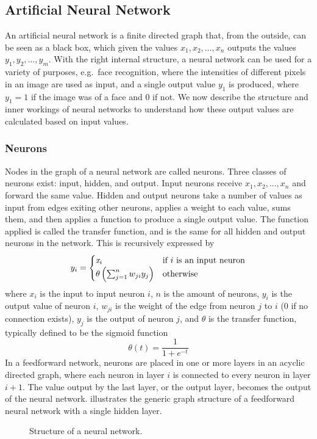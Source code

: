\subsection{Artificial Neural Network}
An artificial neural network is a finite directed graph that, from the outside, can be seen as a black box, which given the values $x_1, x_2, \dots, x_n$ outputs the values $y_1, y_2, \dots, y_m$. With the right internal structure, a neural network can be used for a variety of purposes, e.g.\ face recognition, where the intensities of different pixels in an image are used as input, and a single output value $y_1$ is produced, where $y_1 = 1$ if the image was of a face and $0$ if not. We now describe the structure and inner workings of neural networks to understand how these output values are calculated based on input values.

\subsubsection{Neurons}
Nodes in the graph of a neural network are called neurons. Three classes of neurons exist: input, hidden, and output. Input neurons receive $x_1, x_2, \dots, x_n$ and forward the same value. Hidden and output neurons take a number of values as input from edges exiting other neurons, applies a weight to each value, sums them, and then applies a function to produce a single output value. The function applied is called the transfer function, and is the same for all hidden and output neurons in the network. This is recursively expressed by 
\begin{equation*}\label{eq:weightcalc}
  y_i =
  \begin{cases}
    \var{x}_i                     & \text{if } i \text{ is an input neuron} \\
    \theta\left(\sum_{j=1}^n w_{ji} y_{j} \right) & \text{otherwise} %
  \end{cases}
\end{equation*}
%
where $x_i$ is the input to input neuron $i$, $n$ is the amount of neurons, $y_i$ is the output value of neuron $i$, $w_{ji}$ is the weight of the edge from neuron $j$ to $i$ ($0$ if no connection exists), $y_j$ is the output of neuron $j$, and $\theta$ is the transfer function, typically defined to be the sigmoid function
%
\begin{equation*}
  \theta(t) = \frac{1}{1+e^{-t}}
\end{equation*}
%
In a feedforward network, neurons are placed in one or more layers in an acyclic directed graph, where each neuron in layer $i$ is connected to every neuron in layer $i + 1$. The value output by the last layer, or the output layer, becomes the output of the neural network.  illustrates the generic graph structure of a feedforward neural network with a single hidden layer.
%
\begin{figure}[htpb]
  \centering
  \caption{Structure of a neural network.}
  \label{fig:ann}
\end{figure}
%

